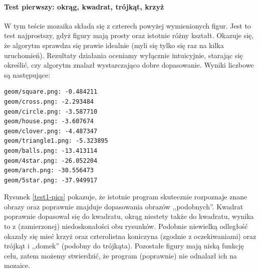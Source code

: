 \documentclass[a4paper,12pt,leqno]{article}
\begin{document}
\paragraph{Test pierwszy: okrąg, kwadrat, trójkąt, krzyż}
W tym teście mozaika składa się z czterech powyżej wymienionych figur. Jest to test najprostszy, gdyż figury mają prosty oraz istotnie różny kształt. Okazuje się, że algorytm sprawdza
się prawie idealnie (myli się tylko się raz na kilka uruchomień). Rezultaty działania oceniamy wyłącznie intuicyjnie, starając się określić, czy algorytm znalazł wystarczająco
dobre dopasowanie. Wyniki liczbowe są następujące: 
\begin{verbatim}
geom/square.png: -0.484211
geom/cross.png: -2.293484
geom/circle.png: -3.587710
geom/house.png: -3.607674
geom/clover.png: -4.487347
geom/triangle1.png: -5.323895
geom/balls.png: -13.413114
geom/4star.png: -26.052204
geom/arch.png: -30.556473
geom/5star.png: -37.949917
\end{verbatim}
Rysunek \ref{test1-pics} pokazuje, że istotnie program skutecznie rozpoznaje znane obrazy oraz poprawnie znajduje dopasowania obrazów ,,podobnych''. Kwadrat poprawnie dopasował się
do kwadratu, okrąg niestety także do kwadratu, wynika to z (zamierzonej) niedoskonałości obu rysunków. Podobnie niewielką odległość okazały się mieć krzyż oraz czterolistna koniczyna
(zgodnie z oczekiwaniami) oraz trójkąt i ,,domek'' (podobny do trójkąta). Pozostałe figury mają niską funkcję celu, zatem możemy stwierdzić, że program (poprawnie) nie odnalazł ich
na mozaice.
\end{document}
